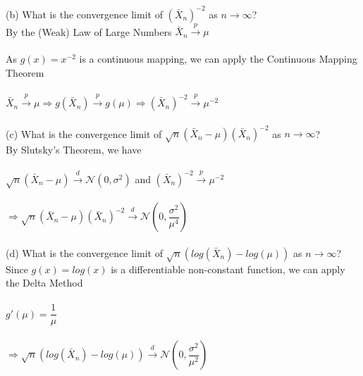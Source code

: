 \documentclass{article}
\begin{document}
(b) What is the convergence limit of $(\bar{X}_n)^{-2}$ as $n\rightarrow\infty$?\\
By the (Weak) Law of Large Numbers $\bar{X}_n\xrightarrow{p}\mu$\\\\
As $g(x)=x^{-2}$ is a continuous mapping, we can apply the Continuous Mapping Theorem\\\\
$\bar{X}_n\xrightarrow{p}\mu\Rightarrow g(\bar{X}_n)\xrightarrow{p}g(\mu)\Rightarrow (\bar{X}_n)^{-2}\xrightarrow{p}\mu^{-2}$\\\\
(c) What is the convergence limit of $\sqrt{n}(\bar{X}_n-\mu)(\bar{X}_n)^{-2}$ as $n\rightarrow\infty$?\\
By Slutsky's Theorem, we have\\\\
$\sqrt{n}(\bar{X}_n-\mu)\xrightarrow{d}\mathcal{N}(0,\sigma^2)$ and $(\bar{X}_n)^{-2}\xrightarrow{p}\mu^{-2}$\\\\
$\Rightarrow \sqrt{n}(\bar{X}_n-\mu)(\bar{X}_n)^{-2}\xrightarrow{d}\mathcal{N}(0,\dfrac{\sigma^2}{\mu^4})$\\\\
(d) What is the convergence limit of $\sqrt{n}(log(\bar{X}_n)-log(\mu))$ as $n\rightarrow\infty$?\\
Since $g(x)=log(x)$ is a differentiable non-constant function, we can apply the Delta Method\\\\
$g'(\mu)=\dfrac{1}{\mu}$\\\\
$\Rightarrow \sqrt{n}(log(\bar{X}_n)-log(\mu))\xrightarrow{d}\mathcal{N}(0,\dfrac{\sigma^2}{\mu^2})$
\pagebreak
\end{document}
